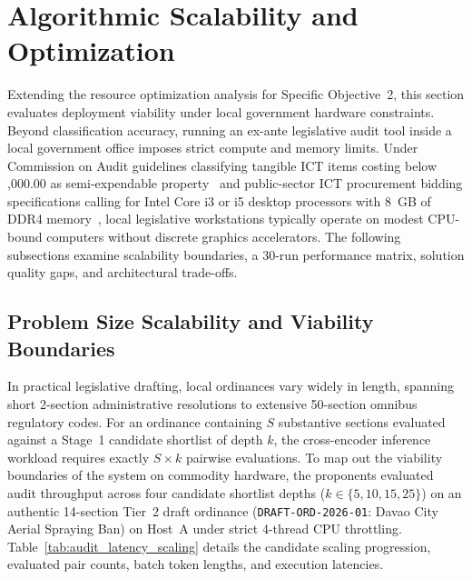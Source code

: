 \section{Algorithmic Scalability and Optimization}
\label{sec:results_scalability_optimization}

Extending the resource optimization analysis for Specific Objective~2, this section evaluates deployment viability under local government hardware constraints. Beyond classification accuracy, running an ex-ante legislative audit tool inside a local government office imposes strict compute and memory limits. Under Commission on Audit guidelines classifying tangible ICT items costing below ,000.00 as semi-expendable property~\cite{coa2022circular004} and public-sector ICT procurement bidding specifications calling for Intel Core i3 or i5 desktop processors with 8~GB of DDR4 memory~\cite{dict2020specs}, local legislative workstations typically operate on modest CPU-bound computers without discrete graphics accelerators. The following subsections examine scalability boundaries, a 30-run performance matrix, solution quality gaps, and architectural trade-offs.


\subsection{Problem Size Scalability and Viability Boundaries}
\label{sec:scalability_boundaries}

In practical legislative drafting, local ordinances vary widely in length, spanning short 2-section administrative resolutions to extensive 50-section omnibus regulatory codes. For an ordinance containing $S$ substantive sections evaluated against a Stage~1 candidate shortlist of depth $k$, the cross-encoder inference workload requires exactly $S \times k$ pairwise evaluations. To map out the viability boundaries of the system on commodity hardware, the proponents evaluated audit throughput across four candidate shortlist depths ($k \in \{5, 10, 15, 25\}$) on an authentic 14-section Tier~2 draft ordinance (\texttt{DRAFT-ORD-2026-01}: Davao City Aerial Spraying Ban) on Host~A under strict 4-thread CPU throttling. Table~\ref{tab:audit_latency_scaling} details the candidate scaling progression, evaluated pair counts, batch token lengths, and execution latencies.

